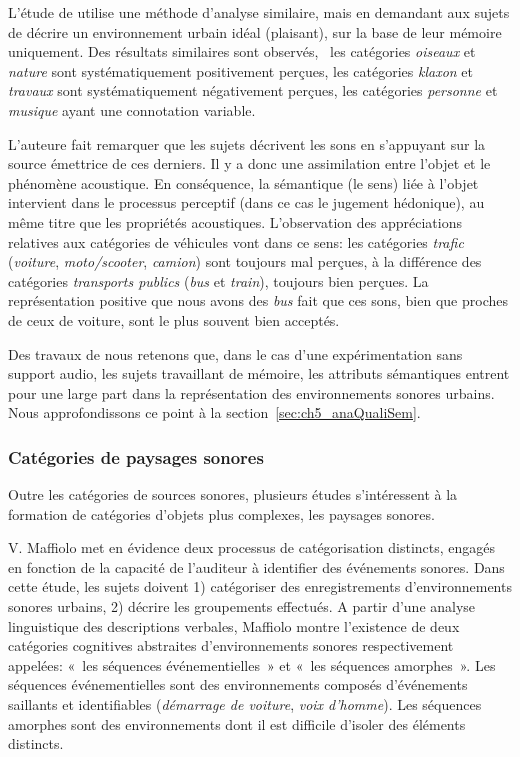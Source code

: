 L'étude de \citep{guastavino2006ideal} utilise une méthode d'analyse similaire, mais en demandant aux sujets de décrire un environnement urbain idéal (plaisant), sur la base de leur mémoire uniquement. Des résultats similaires sont observés, \ie~les catégories \emph{oiseaux} et \emph{nature} sont systématiquement positivement perçues, les catégories \emph{klaxon} et \emph{travaux} sont systématiquement négativement perçues, les catégories \emph{personne} et \emph{musique} ayant une connotation variable.

L'auteure fait remarquer que les sujets décrivent les sons en s'appuyant sur la source émettrice de ces derniers. Il y a donc une assimilation entre l'objet et le phénomène acoustique. En conséquence, la sémantique (le sens) liée à l'objet intervient dans le processus perceptif (dans ce cas le jugement hédonique), au même titre que les propriétés acoustiques. L'observation des appréciations relatives aux catégories de véhicules vont dans ce sens: les catégories \emph{trafic} (\emph{voiture}, \emph{moto/scooter}, \emph{camion}) sont toujours mal perçues, à la différence des catégories \emph{transports publics} (\emph{bus} et \emph{train}), toujours bien perçues. La représentation positive que nous avons des \emph{bus} fait que ces sons, bien que proches de ceux de voiture, sont le plus souvent bien acceptés.  

Des travaux de \citep{guastavino2006ideal} nous retenons que, dans le cas d'une expérimentation sans support audio, les sujets travaillant de mémoire, les attributs sémantiques entrent pour une large part dans la représentation des environnements sonores urbains. Nous approfondissons ce point à la section~\ref{sec:ch5_anaQualiSem}.

\subsubsection{Catégories de paysages sonores}
\label{sec:ch3_catsoundscape}

Outre les catégories de sources sonores, plusieurs études s’intéressent à la formation de catégories d'objets plus complexes, les paysages sonores.

V. Maffiolo \citep{maffiolo_caracterisation_1999} met en évidence deux processus de catégorisation distincts, engagés en fonction de la capacité de l'auditeur à identifier des événements sonores. Dans cette étude, les sujets doivent 1) catégoriser des enregistrements d'environnements sonores urbains, 2) décrire les groupements effectués. A partir d'une analyse linguistique des descriptions verbales, Maffiolo montre l'existence de deux catégories cognitives abstraites d'environnements sonores respectivement appelées: «~les séquences événementielles~» et «~les séquences amorphes~». Les séquences événementielles sont des environnements composés d'événements saillants et identifiables (\emph{démarrage de voiture}, \emph{voix d'homme}). Les séquences amorphes sont des environnements dont il est difficile d'isoler des éléments distincts.

